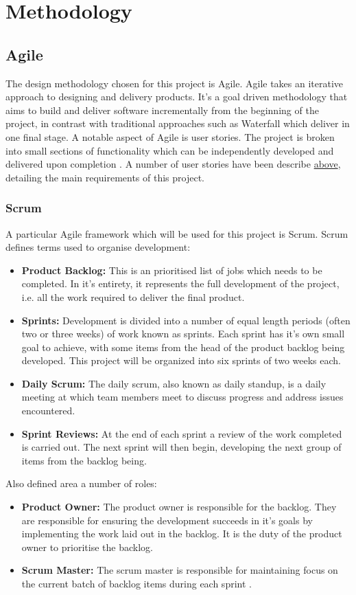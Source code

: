 
\section{Methodology}
	\subsection{Agile}
	The design methodology chosen for this project is Agile. Agile takes an iterative approach to designing and delivery products. It's a goal driven methodology that aims to build and deliver software incrementally from the beginning of the project, in contrast with traditional approaches such as Waterfall which deliver in one final stage. A notable aspect of Agile is user stories. The project is broken into small sections of functionality which can be independently developed and delivered upon completion \citep{rasmusson}. A number of user stories have been describe \hyperref[user-stories]{above}, detailing the main requirements of this project. 
	
	\subsubsection{Scrum}
	
	A particular Agile framework which will be used for this project is Scrum. Scrum defines terms used to organise development:
	\begin{itemize}
		\item \textbf{Product Backlog:} This is an prioritised list of jobs which needs to be completed. In it's entirety, it represents the full development of the project, i.e. all the work required to deliver the final product.
		\item \textbf{Sprints:} Development is divided into a number of equal length periods (often two or three weeks) of work known as sprints. Each sprint has it's own small goal to achieve, with some items from the head of the product backlog being developed. This project will be organized into six sprints of two weeks each.
		\item \textbf{Daily Scrum:} The daily scrum, also known as daily standup, is a daily meeting at which team members meet to discuss progress and address issues encountered.
		\item \textbf{Sprint Reviews:} At the end of each sprint a review of the work completed is carried out. The next sprint will then begin, developing the next group of items from the backlog being\citep{scrum}.
	\end{itemize}
	Also defined area a number of roles:
	\begin{itemize}
		\item \textbf{Product Owner:} The product owner is responsible for the backlog. They are responsible for ensuring the development succeeds in it's goals by implementing the work laid out in the backlog. It is the duty of the product owner to prioritise the backlog. 
		\item \textbf{Scrum Master:} The scrum master is responsible for maintaining focus on the current batch of backlog items during each sprint \cite{agile}.
	\end{itemize}
	
